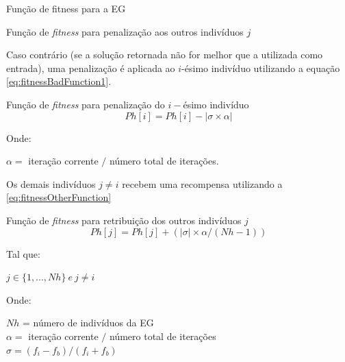 \begin{frame}[allowframebreaks]{Função de fitness para a EG}
\begin{block}{Função de \textit{fitness} para penalização aos outros indivíduos $j$}
	\end{block}
	
	\framebreak
	
	Caso contrário (se a solução retornada não for melhor que a utilizada como entrada), uma penalização é aplicada ao $i$-ésimo indivíduo utilizando a equação \autoref{eq:fitnessBadFunction1}.
	\begin{block}{Função de \textit{fitness} para penalização do $i-$ésimo indivíduo}
		\begin{equation} {}
		\label{eq:fitnessBadFunction1}
		Ph[i] = Ph[i] - |\sigma \times \alpha|
		\end{equation}
		
		Onde: 
		\begin{center}
			$\alpha =$ iteração corrente $/$ número total de iterações.
		\end{center} 
	\end{block}	

	\framebreak
	
	Os demais indivíduos $j \neq i$ recebem uma recompensa utilizando a \autoref{eq:fitnessOtherFunction} 

	\begin{block}{Função de \textit{fitness} para retribuição dos outros indivíduos $j$}
		\begin{equation} {}
		\label{eq:fitnessOtherFunction}
		 Ph[j] = Ph[j] + (|\sigma| \times \alpha / (Nh -1))
		\end{equation}
		
		 Tal que: 
		\begin{center}
		 $j \in \{1, ..., Nh\} ~e~ j \neq i$
		\end{center} 
		
		Onde:
		\begin{center}
		$Nh$ = número de indivíduos da EG \\ $\alpha =$ iteração corrente $/$ número total de iterações \\
		 $\sigma = (f_i - f_b)/(f_i + f_b)$
			
			
		\end{center}
	\end{block}	
\end{frame}	

